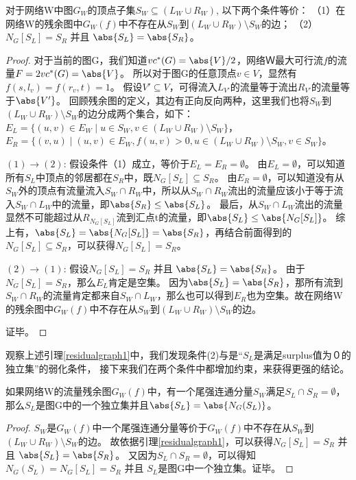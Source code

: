\begin{lemma} \label{residualgraph1}
对于网络W中图$G_W$的顶点子集$S_W \subseteq (L_W \cup R_W)$, 以下两个条件等价：
（1）在网络W的残余图中$G_W(f)$中不存在从$S_W$到$(L_W \cup R_W) \setminus S_W$的边；
（2）$N_G[S_L] = S_R$ 并且 $\abs{S_L} = \abs{S_R}$。
\end{lemma}
\begin{proof}
  对于当前的图G，我们知道$vc^*(G) = \abs{V} / 2$，网络Ｗ最大可行流$f$的流量$F=2vc^*(G)=\abs{V}$。
  所以对于图G的任意顶点$v \in V$，显然有$f(s, l_v) = f(r_v, t) = 1$。
  假设$V' \subseteq V$，可得流入$L_{V'}$的流量等于流出$R_{V'}$的流量等于$\abs{V'}$。
  回顾残余图的定义，其边有正向反向两种，这里我们也将$S_W$到$(L_W \cup R_W) \setminus S_W$的边分成两个集合，如下：
  $E_L = \{(u, v) \in E_W\;|\;u \in S_W,v \in (L_W \cup R_W) \setminus S_W\}$，
  $E_R = \{(v, u)\;|\;(u, v) \in E_W,f(u, v) > 0,u \in (L_W \cup R_W) \setminus S_W,v \in S_W\}$。

  $(1)\rightarrow (2)$: 假设条件（1）成立，等价于$E_L = E_R = \emptyset$。
  由$E_L = \emptyset$，可以知道所有$S_L$中顶点的邻居都在$S_R$中，既$N_G[S_L] \subseteq S_R$。
  由$E_R = \emptyset$，可以知道没有从$S_W$外的顶点有流量流入$S_W \cap R_W$中，所以从$S_W \cap R_W$流出的流量应该小于等于流入$S_W \cap L_W$中的流量，即$\abs{S_R} \le \abs{S_L}$。
  最后，从$S_W \cap L_W$流出的流量显然不可能超过从$R_{N_G[S_L]}$流到汇点t的流量，即$\abs{S_L} \le \abs{N_G[S_L]}$。
  综上有，$\abs{S_L} = \abs{N_G[S_L]} = \abs{S_R}$，再结合前面得到的$N_G[S_L] \subseteq S_R$，可以获得$N_G[S_L] = S_R$。

  $(2)\rightarrow (1)$: 假设$N_G[S_L] = S_R$ 并且 $\abs{S_L} = \abs{S_R}$。
  由于$N_G[S_L] = S_R$，那么$E_L$肯定是空集。
  因为$\abs{S_L} = \abs{S_R}$，那所有流到$S_W \cap R_W$的流量肯定都来自$S_W \cap L_W$，那么也可以得到$E_R$也为空集。故在网络W的残余图中$G_W(f)$中不存在从$S_W$到$(L_W \cup R_W) \setminus S_W$的边。

  证毕。
\end{proof}

观察上述引理\ref{residualgraph1}中，我们发现条件(2)与是“$S_L$是满足surplus值为０的独立集”的弱化条件，
接下来我们在两个条件中都增加约束，来获得更强的结论。
\begin{lemma} \label{residualgraph2}
如果网络W的流量残余图$G_W(f)$中，有一个尾强连通分量$S_W$满足$S_L \cap S_R = \emptyset$，
那么$S_L$是图G中的一个独立集并且$\abs{S_L} = \abs{N_G(S_L)}$。
\end{lemma}
\begin{proof}
$S_W$是$G_W(f)$中一个尾强连通分量等价于$G_W(f)$中不存在从$S_W$到$(L_W \cup R_W) \setminus S_W$的边。
故依据引理\ref{residualgraph1}，可以获得$N_G[S_L] = S_R$ 并且 $\abs{S_L} = \abs{S_R}$。
又因为$S_L \cap S_R = \emptyset$，可以得知$N_G(S_L) = N_G[S_L] = S_R$ 并且 $S_L$是图G中一个独立集。证毕。
\end{proof}


